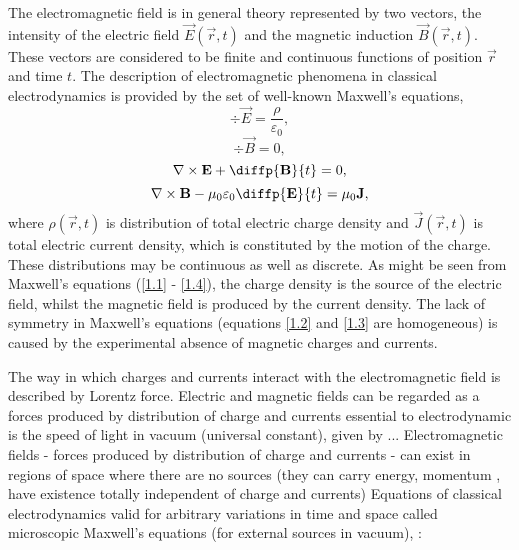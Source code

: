 The electromagnetic field is in general theory represented by two vectors, the intensity of the electric field $ \vec{E}\left( \vec{r}, t \right) $ and the magnetic induction $ \vec{B}\left( \vec{r}, t \right) $. These vectors are considered to be finite and continuous functions of position $ \vec{r} $ and time $ t $. The description of electromagnetic phenomena in classical electrodynamics is provided by the set of well-known Maxwell's equations,
\begin{equation}
\label{1.1}
\div{\vec{E}} = \frac{\rho}{\varepsilon_0},
\end{equation}
\begin{equation}
\label{1.2}
\div{\vec{B}} = 0,
\end{equation}
\begin{equation}
\label{1.3}
\rot{\vec{E}} + \diffp{\vec{B}}{t} = 0,
\end{equation}
\begin{equation}
\label{1.4}
\rot{\vec{B}} - \mu_0 \varepsilon_0 \diffp{\vec{E}}{t}= \mu_0 \vec{J},
\end{equation}
where $ \rho\left( \vec{r}, t \right) $ is distribution of total electric charge density and $ \vec{J}\left( \vec{r}, t \right) $ is total electric current density, which is constituted by the motion of the charge. These distributions may be continuous as well as discrete. As might be seen from Maxwell's equations (\ref{1.1} - \ref{1.4}), the charge density is the source of the electric field, whilst the magnetic field is produced by the current density. The lack of symmetry in Maxwell's equations (equations \ref{1.2} and \ref{1.3} are homogeneous) is caused by the experimental absence of magnetic charges and currents.

The way in which charges and currents interact with the electromagnetic field is described by Lorentz force.
Electric and magnetic fields can be regarded as a forces produced by distribution of charge and currents
essential to electrodynamic is the speed of light in vacuum (universal constant), given by ...
Electromagnetic fields - forces produced by distribution of charge and currents - can exist in regions of space where there are no sources (they can carry energy, momentum , have existence totally independent of charge and currents) 
Equations of classical electrodynamics valid for arbitrary variations in time and space
called microscopic Maxwell's equations (for external sources in vacuum), :

